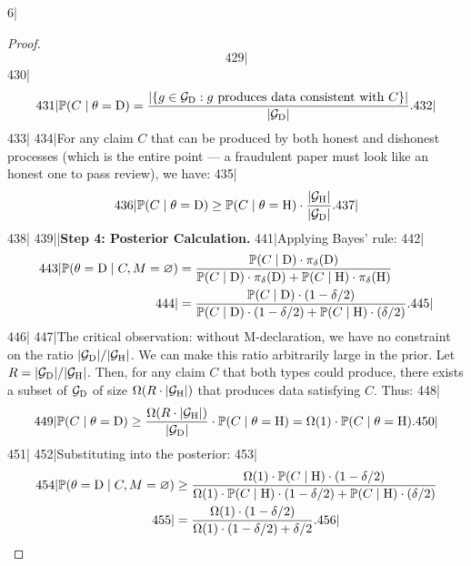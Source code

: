 6|\documentclass[12pt,a4paper]{article}
\begin{document}
\begin{proof}
\begin{equation}
429|\end{equation}
430|\begin{equation}
431|    \mathbb{P}(C \mid \theta = \text{D}) = \frac{|\{g \in \mathcal{G}_{\text{D}} : g \text{ produces data consistent with } C\}|}{|\mathcal{G}_{\text{D}}|}.
432|\end{equation}
433|
434|For any claim $C$ that can be produced by both honest and dishonest processes (which is the entire point — a fraudulent paper must look like an honest one to pass review), we have:
435|\begin{equation}
436|    \mathbb{P}(C \mid \theta = \text{D}) \ge \mathbb{P}(C \mid \theta = \text{H}) \cdot \frac{|\mathcal{G}_{\text{H}}|}{|\mathcal{G}_{\text{D}}|}.
437|\end{equation}
438|
439||\noindent\textbf{Step 4: Posterior Calculation.}
441|Applying Bayes' rule:
442|\begin{align}
443|    \mathbb{P}(\theta = \text{D} \mid C, M = \varnothing) &= \frac{\mathbb{P}(C \mid \text{D}) \cdot \pi_\delta(\text{D})}{\mathbb{P}(C \mid \text{D}) \cdot \pi_\delta(\text{D}) + \mathbb{P}(C \mid \text{H}) \cdot \pi_\delta(\text{H})} \\
444|    &= \frac{\mathbb{P}(C \mid \text{D}) \cdot (1 - \delta/2)}{\mathbb{P}(C \mid \text{D}) \cdot (1 - \delta/2) + \mathbb{P}(C \mid \text{H}) \cdot (\delta/2)}.
445|\end{align}
446|
447|The critical observation: without M-declaration, we have no constraint on the ratio $|\mathcal{G}_{\text{D}}| / |\mathcal{G}_{\text{H}}|$. We can make this ratio arbitrarily large in the prior. Let $R = |\mathcal{G}_{\text{D}}| / |\mathcal{G}_{\text{H}}|$. Then, for any claim $C$ that both types could produce, there exists a subset of $\mathcal{G}_{\text{D}}$ of size $\Omega(R \cdot |\mathcal{G}_{\text{H}}|)$ that produces data satisfying $C$. Thus:
448|\begin{equation}
449|    \mathbb{P}(C \mid \theta = \text{D}) \ge \frac{\Omega(R \cdot |\mathcal{G}_{\text{H}}|)}{|\mathcal{G}_{\text{D}}|} \cdot \mathbb{P}(C \mid \theta = \text{H}) = \Omega(1) \cdot \mathbb{P}(C \mid \theta = \text{H}).
450|\end{equation}
451|
452|Substituting into the posterior:
453|\begin{align}
454|    \mathbb{P}(\theta = \text{D} \mid C, M = \varnothing) &\ge \frac{\Omega(1) \cdot \mathbb{P}(C \mid \text{H}) \cdot (1 - \delta/2)}{\Omega(1) \cdot \mathbb{P}(C \mid \text{H}) \cdot (1 - \delta/2) + \mathbb{P}(C \mid \text{H}) \cdot (\delta/2)} \\
455|    &= \frac{\Omega(1) \cdot (1 - \delta/2)}{\Omega(1) \cdot (1 - \delta/2) + \delta/2}.
456|\end{align}

\end{proof}
\end{document}
